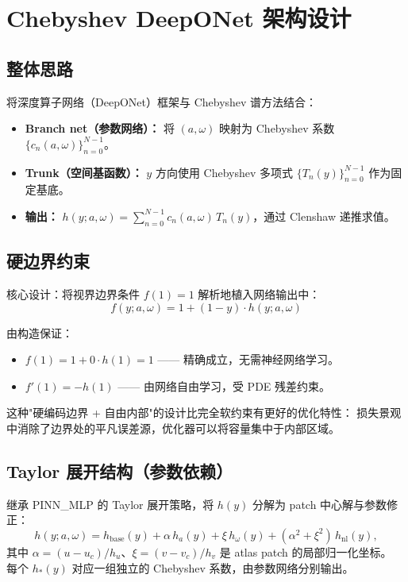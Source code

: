 \documentclass[11pt,a4paper]{article}
\begin{document}
\section{Chebyshev DeepONet 架构设计}

\subsection{整体思路}

将深度算子网络（DeepONet）框架与 Chebyshev 谱方法结合：
\begin{itemize}
    \item \textbf{Branch net（参数网络）：} 将 $(a,\omega)$ 映射为 Chebyshev 系数 $\{c_n(a,\omega)\}_{n=0}^{N-1}$。
    \item \textbf{Trunk（空间基函数）：} $y$ 方向使用 Chebyshev 多项式 $\{T_n(y)\}_{n=0}^{N-1}$ 作为固定基底。
    \item \textbf{输出：} $h(y;a,\omega) = \sum_{n=0}^{N-1} c_n(a,\omega)\,T_n(y)$，通过 Clenshaw 递推求值。
\end{itemize}

\subsection{硬边界约束}

核心设计：将视界边界条件 $f(1)=1$ 解析地植入网络输出中：
\begin{equation}
\boxed{f(y;a,\omega) = 1 + (1-y)\cdot h(y;a,\omega)}
\label{eq:hard_bc}
\end{equation}

\noindent 由构造保证：
\begin{itemize}
    \item $f(1) = 1 + 0\cdot h(1) = 1$ —— 精确成立，无需神经网络学习。
    \item $f'(1) = -h(1)$ —— 由网络自由学习，受 PDE 残差约束。
\end{itemize}

这种"硬编码边界 + 自由内部"的设计比完全软约束有更好的优化特性：
损失景观中消除了边界处的平凡误差源，优化器可以将容量集中于内部区域。

\subsection{Taylor 展开结构（参数依赖）}

继承 PINN\_MLP 的 Taylor 展开策略，将 $h(y)$ 分解为 patch 中心解与参数修正：
\begin{equation}
h(y;a,\omega) = h_{\text{base}}(y) + \alpha\,h_a(y) + \xi\,h_\omega(y) + (\alpha^2+\xi^2)\,h_{\text{nl}}(y),
\label{eq:taylor}
\end{equation}
其中 $\alpha = (u-u_c)/h_u$、$\xi = (v-v_c)/h_v$ 是 atlas patch 的局部归一化坐标。
每个 $h_*(y)$ 对应一组独立的 Chebyshev 系数，由参数网络分别输出。
\end{document}
